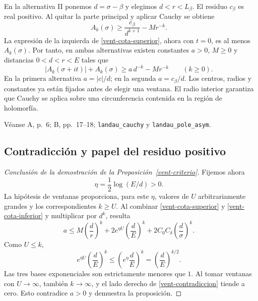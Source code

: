 En la alternativa II ponemos $d=\sigma-\beta$ y elegimos
$d<r<L_\beta$. El residuo $c_\beta$ es real positivo.
Al quitar la parte principal y aplicar Cauchy se obtiene
\begin{equation}
 A_k(\sigma)\ge\frac{c_\beta}{d^{k+1}}-Mr^{-k}.
 \label{vent-polo-real}
\end{equation}
La expresión de la izquierda de \eqref{vent-cota-superior}, ahora
con $t=0$, es al menos $A_k(\sigma)$. Por tanto, en ambas alternativas
existen constantes $a>0$, $M\ge0$ y distancias $0<d<r<E$ tales que
\begin{equation}
 |A_k(\sigma+it)|+A_k(\sigma)
 \ge a\,d^{-k}-Mr^{-k}
 \qquad(k\ge0).
 \label{vent-cota-inferior}
\end{equation}
En la primera alternativa $a=|c|/d$; en la segunda $a=c_\beta/d$.
Los centros, radios y constantes ya están fijados antes de elegir
una ventana. El radio interior garantiza que Cauchy se aplica sobre
una circunferencia contenida en la región de holomorfía.

{\raggedright
Véanse A, p.~6; B, pp.~17--18; \texttt{landau\_cauchy}
y \texttt{landau\_pole\_asym}.
\par}

\subsection{Contradicción y papel del residuo positivo}

\begin{proof}[Conclusión de la demostración de la Proposición~\ref{vent-criterio}]
Fijemos ahora
\[
 \eta=\frac12\log(E/d)>0.
\]
La hipótesis de ventanas proporciona, para este $\eta$, valores de $U$
arbitrariamente grandes y los correspondientes $k\ge U$.
Al combinar \eqref{vent-cota-superior} y \eqref{vent-cota-inferior}
y multiplicar por $d^k$, resulta
\begin{equation}
 a\le M\left(\frac dr\right)^k
 +2e^{\eta U}\left(\frac dE\right)^k
 +2C_0C_\delta\left(\frac d\sigma\right)^k.
 \label{vent-contradiccion}
\end{equation}
Como $U\le k$,
\[
 e^{\eta U}\left(\frac dE\right)^k
 \le\left(e^\eta\frac dE\right)^k
 =\left(\frac dE\right)^{k/2}.
\]
Las tres bases exponenciales son estrictamente menores que $1$.
Al tomar ventanas con $U\to\infty$, también $k\to\infty$, y el lado
derecho de \eqref{vent-contradiccion} tiende a cero.
Esto contradice $a>0$ y demuestra la proposición.
\end{proof}

